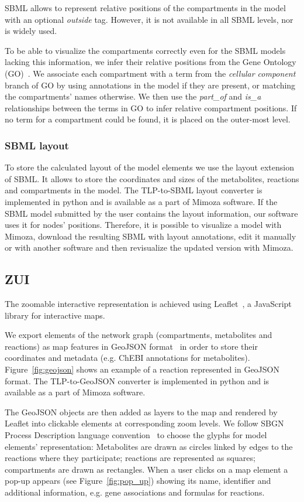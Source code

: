 \documentclass{bmcart}
\begin{document}
SBML allows to represent relative positions of the compartments in the model with an optional \emph{outside} tag. However, it is not available in all SBML levels, nor is widely used.

To be able to visualize the compartments correctly even for the SBML models lacking this information, we infer their relative positions from the Gene Ontology (GO)~\cite{Ashburner2000}. We associate each compartment with a term from the \emph{cellular component} branch of GO by using annotations in the model if they are present, or matching the compartments' names otherwise. We then use the \emph{part\_of} and \emph{is\_a} relationships between the terms in GO to infer relative compartment positions. If no term for a compartment could be found, it is placed on the outer-most level. 

\subsubsection*{SBML layout}
To store the calculated layout of the model elements we use the layout extension~\cite{Gauges2013} of SBML. It allows to store the coordinates and sizes of the metabolites, reactions and compartments in the model. The TLP-to-SBML layout converter is implemented in python and is available as a part of Mimoza software.
If the SBML model submitted by the user contains the layout information, our software uses it for nodes' positions. Therefore, it is possible to visualize a model with Mimoza, download the resulting SBML with layout annotations, edit it manually or with another software and then revisualize the updated version with Mimoza.
 
\subsection*{ZUI}

The zoomable interactive representation is achieved using Leaflet~\cite{Agafonkin}, a JavaScript library for interactive maps. 

We export elements of the network graph (compartments, metabolites and reactions) as map features in GeoJSON format~\cite{Butler} in order to store their coordinates and metadata (e.g. ChEBI annotations for metabolites). Figure~\ref{fig:geojson} shows an example of a reaction represented in GeoJSON format. The TLP-to-GeoJSON converter is implemented in python and is available as a part of Mimoza software. 

The GeoJSON objects are then added as layers to the map and rendered by Leaflet into clickable elements at corresponding zoom levels. We follow SBGN Process Description language convention~\cite{LeNovere2009} to choose the glyphs for model elements' representation: Metabolites are drawn as circles linked by edges to the reactions where they participate; reactions are represented as squares; compartments are drawn as rectangles.  When a user clicks on a map element a pop-up appears (see Figure~\ref{fig:pop_up}) showing its name, identifier and additional information, e.g. gene associations and formulas for reactions. 
 
\end{document}
